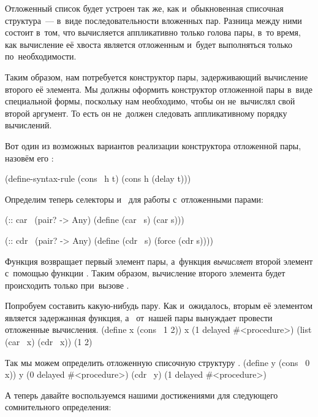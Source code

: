 Отложенный список будет устроен так же, как и~обыкновенная списочная структура~--- в~виде последовательности вложенных пар. Разница между ними состоит в~том, что вычисляется аппликативно только голова пары, в~то время, как вычисление её хвоста является отложенным и~будет выполняться только по~необходимости.

Таким образом, нам потребуется конструктор пары, задерживающий вычисление второго её элемента. Мы должны оформить конструктор отложенной пары в~виде специальной формы, поскольку нам необходимо, чтобы он не~вычислял свой второй аргумент. То есть он не~должен следовать аппликативному порядку вычислений.

\newpage
\label{lazy-cons}Вот один из возможных вариантов реализации конструктора отложенной пары, назовём его :

\begin{Definition}[emph={h,t}]
(define-syntax-rule (cons~ h t)
   (cons h (delay t)))
\end{Definition}

Определим теперь селекторы  и~ для работы с~отложенными парами:

\begin{Definition}
(:: car~ (pair? -> Any)
 (define (car~ s) (car s)))

(:: cdr~ (pair? -> Any)
 (define (cdr~ s) (force (cdr s))))
\end{Definition}

Функция  возвращает первый элемент пары, а~функция  \emph{вычисляет} второй элемент с~помощью функции . Таким образом, вычисление второго элемента будет происходить только при~вызове .

\begin{example}{Попробуем составить какую-нибудь пару. Как и~ожидалось, вторым её элементом является задержанная функция, а~ от~нашей пары вынуждает провести отложенные вычисления.}
\REPLin
  {(define x (cons~ 1 2))}
\REPL
  {x}
  {(1 delayed \#<procedure>)}
\REPL
  {(list (car~ x) (cdr~ x))}
  {(1 2)}
\end{example}

\begin{example}{Так мы можем определить отложенную списочную структуру .}
\REPLin
  {(define y (cons~ 0 x))}
\REPL
  {y}
  {(0 delayed \#<procedure>)}
\REPL
  {(cdr~ y)}
  {(1 delayed \#<procedure>)}
\end{example}

А теперь давайте воспользуемся нашими достижениями для следующего сомнительного определения:

